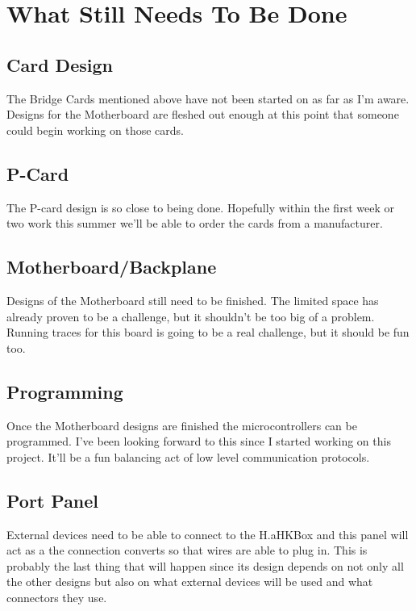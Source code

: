 \documentclass[prb,preprint]{revtex4-1}
\begin{document}
\section{What Still Needs To Be Done}
\subsection{Card Design}
The Bridge Cards mentioned above have not been started on as far as I'm aware. Designs for the Motherboard are fleshed out enough at this point that someone could begin working on those cards. 

\subsection{P-Card}
The P-card design is so close to being done. Hopefully within the first week or two work this summer we'll be able to order the cards from a manufacturer.

\subsection{Motherboard/Backplane}
Designs of the Motherboard still need to be finished. The limited space has already proven to be a challenge, but it shouldn't be too big of a problem. Running traces for this board is going to be a real challenge, but it should be fun too.

\subsection{Programming}
Once the Motherboard designs are finished the microcontrollers can be programmed. I've been looking forward to this since I started working on this project. It'll be a fun balancing act of low level communication protocols.

\subsection{Port Panel}
External devices need to be able to connect to the H.aHKBox and this panel will act as a the connection converts so that wires are able to plug in. This is probably the last thing that will happen since its design depends on not only all the other designs but also on what external devices will be used and what connectors they use.
\end{document}
